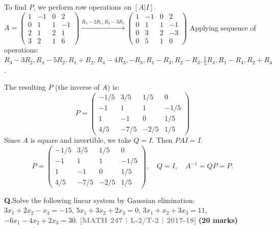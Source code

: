 \documentclass[12pt,a3paper]{article}
\newcommand{\yr}[1]{\hfill\textcolor{gray}{\small\textbf{[#1]}}}
\newcommand{\mk}[1]{\textcolor{orange!70!black}{\small\textbf{(#1 marks)}}}
\newcounter{qnum}
\newcommand{\Q}[1]{%
  \needspace{4\baselineskip}
  \refstepcounter{qnum}
  \vspace{6pt}
  \noindent\textbf{Q\theqnum.}\enspace #1\par
}
\begin{document}
\begin{tcolorbox}[enhanced,breakable,
  colback=cB!4,colframe=cB,boxrule=0.8pt,arc=5pt,
  title={\textbf{Answer --- $PAQ=I$ for $4\times4$ Matrix; $A^{-1}=QP$}},
  fonttitle=\bfseries\color{white},colbacktitle=cB]

To find $P$, we perform row operations on $[A|I]$. 
$A=\begin{pmatrix}1&-1&0&2\\0&1&1&-1\\2&1&2&1\\3&2&1&6\end{pmatrix} \xrightarrow{R_3-2R_1, R_4-3R_1} \begin{pmatrix}1&-1&0&2\\0&1&1&-1\\0&3&2&-3\\0&5&1&0\end{pmatrix}$
Applying sequence of operations: $R_3-3R_2, R_4-5R_2, R_1+R_2, R_4-4R_3, -R_3, R_1-R_3, R_2-R_3, \frac{1}{5}R_4, R_1-R_4, R_2+R_4$.

The resulting $P$ (the inverse of $A$) is:
\[ P = \begin{pmatrix} -1/5 & 3/5 & 1/5 & 0 \\ -1 & 1 & 1 & -1/5 \\ 1 & -1 & 0 & 1/5 \\ 4/5 & -7/5 & -2/5 & 1/5 \end{pmatrix} \]
Since $A$ is square and invertible, we take $Q=I$. Then $PAI=I$.
\[ \boxed{P = \begin{pmatrix} -1/5 & 3/5 & 1/5 & 0 \\ -1 & 1 & 1 & -1/5 \\ 1 & -1 & 0 & 1/5 \\ 4/5 & -7/5 & -2/5 & 1/5 \end{pmatrix}, \quad Q = I, \quad A^{-1} = QP = P.} \]
\end{tcolorbox}



\Q{Solve the following linear system by Gaussian elimination:
$3x_1 + 2x_2 - x_3 = -15$, $5x_1 + 3x_2 + 2x_3 = 0$, $3x_1 + x_2 + 3x_3 = 11$, $-6x_1 - 4x_2 + 2x_3 = 30$.
\yr{MATH 247 | L-2/T-2 | 2017-18} \mk{20}}
\end{document}

